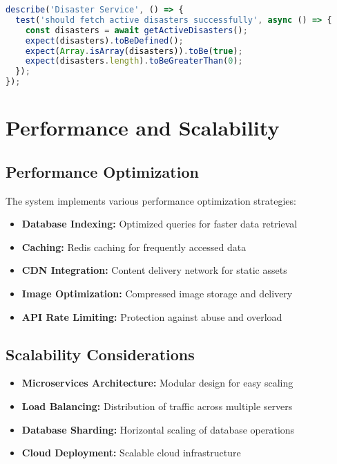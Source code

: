 \documentclass[12pt,a4paper]{article}
\begin{document}
\begin{lstlisting}[language=JavaScript, caption=Example Test Case]
describe('Disaster Service', () => {
  test('should fetch active disasters successfully', async () => {
    const disasters = await getActiveDisasters();
    expect(disasters).toBeDefined();
    expect(Array.isArray(disasters)).toBe(true);
    expect(disasters.length).toBeGreaterThan(0);
  });
});
\end{lstlisting}

\section{Performance and Scalability}

\subsection{Performance Optimization}

The system implements various performance optimization strategies:

\begin{itemize}
    \item \textbf{Database Indexing:} Optimized queries for faster data retrieval
    \item \textbf{Caching:} Redis caching for frequently accessed data
    \item \textbf{CDN Integration:} Content delivery network for static assets
    \item \textbf{Image Optimization:} Compressed image storage and delivery
    \item \textbf{API Rate Limiting:} Protection against abuse and overload
\end{itemize}

\subsection{Scalability Considerations}

\begin{itemize}
    \item \textbf{Microservices Architecture:} Modular design for easy scaling
    \item \textbf{Load Balancing:} Distribution of traffic across multiple servers
    \item \textbf{Database Sharding:} Horizontal scaling of database operations
    \item \textbf{Cloud Deployment:} Scalable cloud infrastructure
\end{itemize}
\end{document}
